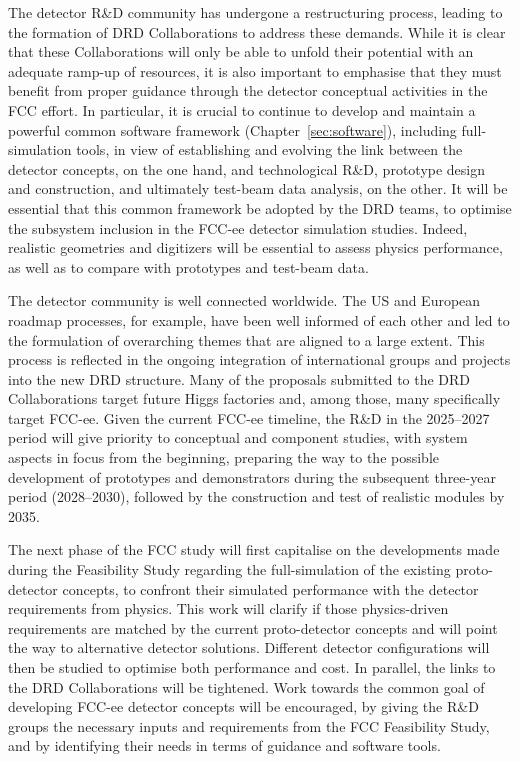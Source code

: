 The detector R\&D community has undergone a restructuring process, 
leading to the formation of DRD Collaborations to address these demands. 
While it is clear that these Collaborations will only be able to unfold their potential 
with an adequate ramp-up of resources, 
it is also important to emphasise that they must benefit from proper guidance 
through the detector conceptual activities in the FCC effort. 
In particular, it is crucial to continue to develop and maintain a powerful common software framework 
(Chapter~\ref{sec:software}), including full-simulation tools, 
in view of establishing and evolving the link between the detector concepts, on the one hand, 
and technological R\&D, prototype design and construction, and ultimately test-beam data analysis, on the other. 
It will be essential that this common framework be adopted by the DRD teams, 
to optimise the subsystem inclusion in the FCC-ee detector simulation studies. 
Indeed, realistic geometries and digitizers will be essential to assess physics performance, 
as well as to compare with prototypes and test-beam data.

The detector community is well connected worldwide. 
The US and European roadmap processes, for example, 
have been well informed of each other and led to the formulation of overarching themes that are aligned to a large extent. 
This process is reflected in the ongoing integration of international groups and projects into the new DRD structure. 
Many of the proposals submitted to the DRD Collaborations target future Higgs factories and, 
among those, many specifically target FCC-ee. 
Given the current FCC-ee timeline, the R\&D in the 2025--2027 period will give priority to conceptual and component studies, 
with system aspects in focus from the beginning, 
preparing the way to the possible development of prototypes and demonstrators 
during the subsequent three-year period (2028--2030), 
followed by the construction and test of realistic modules by 2035. 

The next phase of the FCC study will first capitalise on the developments made during the Feasibility Study 
regarding the full-simulation of the existing proto-detector concepts, 
to confront their simulated performance with the detector requirements from physics. 
This work will clarify if those physics-driven requirements are matched by the current proto-detector concepts 
and will point the way to alternative detector solutions.
Different detector configurations will then be studied to optimise both performance and cost. 
In parallel, the links to the DRD Collaborations will be tightened. 
Work towards the common goal of developing FCC-ee detector concepts will be encouraged, 
by giving the R\&D groups the necessary inputs and requirements from the FCC Feasibility Study, 
and by identifying their needs in terms of guidance and software tools. 

